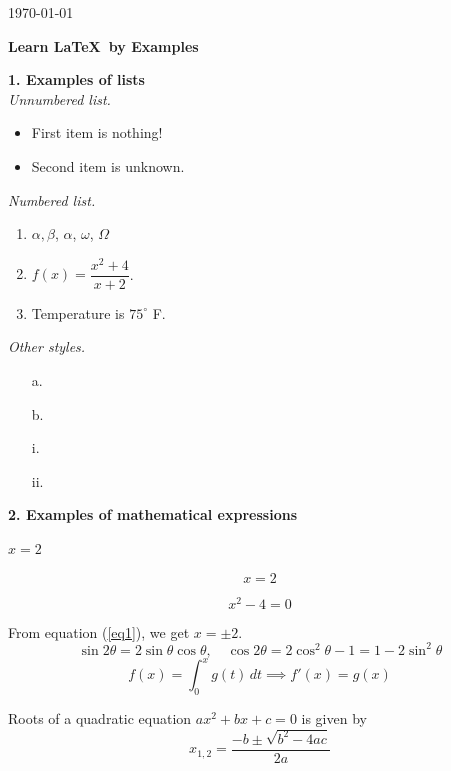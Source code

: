 \documentclass[12pt]{article}
\begin{document}
\hfill \today

\begin{center}
\textbf{\Large  Learn \LaTeX\  by Examples}
\end{center}

\noindent \hrulefill

\noindent \textbf{1. Examples of lists}\\
 
\textit{Unnumbered list.}
\begin{itemize}
\item First item is nothing!
\item Second item is unknown.
\end{itemize}

\vspace{0.25in}

\textit{Numbered list.} 
\begin{enumerate}
\item $\alpha, \beta$, $\alpha$, $\omega$, $\Omega$
\item $f(x)=\dfrac{x^2+4}{x+2}$.
\item Temperature is $75^\circ$ F.
\end{enumerate}

\vspace{0.25in}

\textit{Other styles.}  
\begin{enumerate}
\item[a.] 
\item[b.] 
\end{enumerate}

\begin{itemize}
\item[i.] 
\item[ii.] 
\end{itemize}


\newpage
\noindent \textbf{2. Examples of mathematical expressions} 


$x=2$

\[ x=2\] 

\begin{equation}\label{eq1}
x^2-4=0
\end{equation}

From equation (\ref{eq1}), we get $x=\pm 2$.
%
\[\sin2\theta = 2\sin\theta\cos\theta, \quad \cos2\theta = 2\cos^2\theta -1 =1 -2\sin^2\theta\]
%
$$f(x)=\int_0^x g(t)\, dt \implies f'(x) = g(x)$$

Roots of a quadratic equation $ax^2+bx+c=0$ is given by 
\begin{equation}
x_{1,2}=\frac{-b\pm \sqrt{b^2-4ac}}{2a}
\end{equation} 
\end{document}
